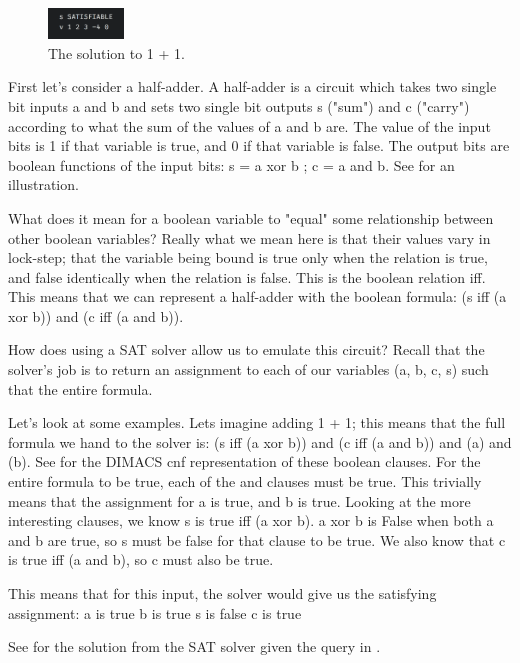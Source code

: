 \begin{figure}[t]
    \centerline{\includegraphics[origin=c,width=2cm]{fig_one_plus_one_sol}}
    \caption{The solution to 1 + 1.}%
    \label{fig:one_plus_one_sol}%
\end{figure}

First let's consider a half-adder. A half-adder is a circuit which takes two single bit inputs a and b and sets two single bit outputs s ("sum") and c ("carry") according to what the sum of the values of a and b are. The value of the input bits is 1 if that variable is true, and 0 if that variable is false. The output bits are boolean functions of the input bits: s = a xor b ; c = a and b. See  for an illustration.

What does it mean for a boolean variable to "equal" some relationship between other boolean variables? Really what we mean here is that their values vary in lock-step; that the variable being bound is true only when the relation is true, and false identically when the relation is false. This is the boolean relation iff. This means that we can represent a half-adder with the boolean formula:
(s iff (a xor b)) and (c iff (a and b)).

How does using a SAT solver allow us to emulate this circuit? Recall that the solver's job is to return an assignment to each of our variables (a, b, c, s) such that the entire formula.

Let's look at some examples. Lets imagine adding 1 + 1; this means that the full formula we hand to the solver is:
(s iff (a xor b)) and (c iff (a and b)) and (a) and (b). See  for the DIMACS cnf representation of these boolean clauses.
For the entire formula to be true, each of the and clauses must be true. This trivially means that the assignment for a is true, and b is true. Looking at the more interesting clauses, we know s is true iff (a xor b). a xor b is False when both a and b are true, so s must be false for that clause to be true. We also know that c is true iff (a and b), so c must also be true.

This means that for this input, the solver would give us the satisfying assignment:
a is true
b is true
s is false
c is true

See  for the solution from the SAT solver given the query in .

